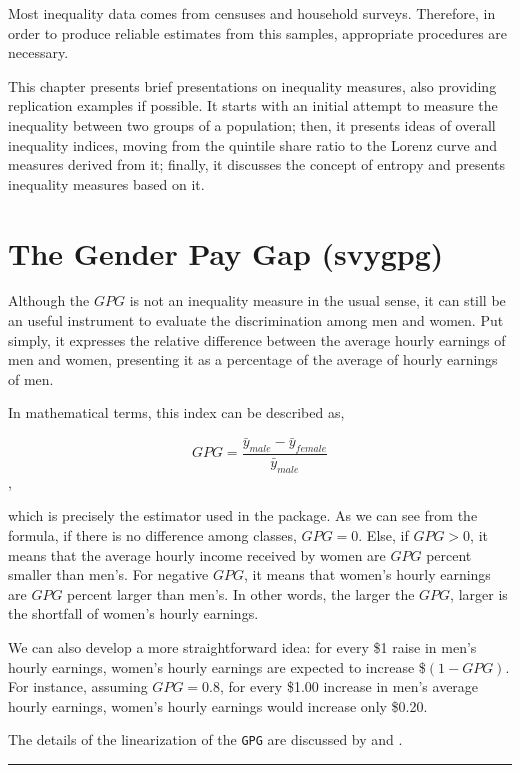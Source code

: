 \documentclass[]{book}
\begin{document}
Most inequality data comes from censuses and household surveys.
Therefore, in order to produce reliable estimates from this samples,
appropriate procedures are necessary.

This chapter presents brief presentations on inequality measures, also
providing replication examples if possible. It starts with an initial
attempt to measure the inequality between two groups of a population;
then, it presents ideas of overall inequality indices, moving from the
quintile share ratio to the Lorenz curve and measures derived from it;
finally, it discusses the concept of entropy and presents inequality
measures based on it.

\section{The Gender Pay Gap (svygpg)}\label{the-gender-pay-gap-svygpg}

Although the \(GPG\) is not an inequality measure in the usual sense, it
can still be an useful instrument to evaluate the discrimination among
men and women. Put simply, it expresses the relative difference between
the average hourly earnings of men and women, presenting it as a
percentage of the average of hourly earnings of men.

In mathematical terms, this index can be described as,

\[ GPG = \frac{ \bar{y}_{male} - \bar{y}_{female} }{ \bar{y}_{male} } \],

which is precisely the estimator used in the package. As we can see from
the formula, if there is no difference among classes, \(GPG = 0\). Else,
if \(GPG > 0\), it means that the average hourly income received by
women are \(GPG\) percent smaller than men's. For negative \(GPG\), it
means that women's hourly earnings are \(GPG\) percent larger than
men's. In other words, the larger the \(GPG\), larger is the shortfall
of women's hourly earnings.

We can also develop a more straightforward idea: for every \$1 raise in
men's hourly earnings, women's hourly earnings are expected to increase
\$\((1-GPG)\). For instance, assuming \(GPG = 0.8\), for every \$1.00
increase in men's average hourly earnings, women's hourly earnings would
increase only \$0.20.

The details of the linearization of the \texttt{GPG} are discussed by
\citet{deville1999} and \citet{osier2009}.

\begin{center}\rule{0.5\linewidth}{\linethickness}\end{center}
\end{document}
